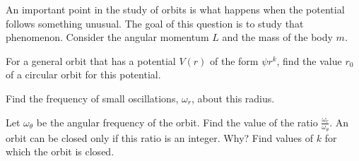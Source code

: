 \documentclass[11pt]{article}
\begin{document}
\begin{pproblem} An important point in the study of orbits is what happens when the potential follows something unusual. The goal of this question is to study that phenomenon. Consider the angular momentum \(L\) and the mass of the body \(m\).
    \begin{alternativas}
        \item For a general orbit that has a potential \(V(r)\) of the form \(\psi r^k\), find the value \(r_0\) of a circular orbit for this potential.
        
        \item Find the frequency of small oscillations, \(\omega_r\), about this radius. 
        
        \item Let \(\omega_\theta\) be the angular frequency of the orbit. Find the value of the ratio \(\frac{\omega_r}{\omega_\theta}\). An orbit can be closed only if this ratio is an integer. Why? Find values of \(k\) for which the orbit is closed.
         
    \end{alternativas} 

    
\end{pproblem}
\end{document}
